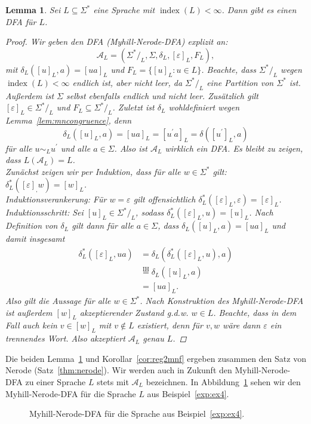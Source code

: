 \documentclass[11pt, a4paper]{article}
\theoremstyle{definition}
\theoremstyle{plain}
\newtheorem{lemma}[definition]{Lemma}
\numberwithin{equation}{section}
\DeclareMathOperator{\ind}{index}
\begin{document}
\begin{lemma}\label{lem:mnf2reg}
	Sei $L \subseteq \Sigma^\ast$ eine Sprache mit $\ind(L) < \infty$. Dann gibt es einen DFA für $L$.
	\begin{proof}
		Wir geben den DFA (\textit{Myhill-Nerode-DFA}) explizit an:
		$$
			\mathcal{A}_L = (\Sigma^\ast/_L, \Sigma, \delta_L, [\varepsilon]_L, F_L),
		$$
		mit $\delta_L([u]_L, a) = [ua]_L$ und $F_L = \{[u]_L : u \in L\}$. Beachte, dass $\Sigma^\ast/_L$ wegen $\ind(L) < \infty$ endlich ist, aber nicht leer, da $\Sigma^\ast/_L$ eine Partition von $\Sigma^\ast$ ist. Außerdem ist $\Sigma$ selbst ebenfalls endlich und nicht leer. Zusätzlich gilt $[\varepsilon]_L \in \Sigma^\ast/_L$ und $F_L \subseteq \Sigma^\ast/_L$. Zuletzt ist $\delta_L$ wohldefiniert wegen Lemma~\ref{lem:mncongruence}, denn 
		$$
			\delta_L([u]_L, a) = [ua]_L = [u^\prime a]_L = \delta([u^\prime]_L, a)
		$$
		für alle $u \sim_L u^\prime$ und alle $a \in \Sigma$. Also ist $\mathcal{A}_L$ wirklich ein DFA. Es bleibt zu zeigen, dass $L(\mathcal{A}_L) = L$.\\
		Zunächst zeigen wir per Induktion, dass für alle $w \in \Sigma^\ast$ gilt: $\delta_L^\ast([\varepsilon]_, w) = [w]_L$.\\
		Induktionsverankerung: Für $w = \varepsilon$ gilt offensichtlich $\delta_L^\ast([\varepsilon]_L, \varepsilon) = [\varepsilon]_L$. \checkmark\\
		Induktionsschritt: Sei $[u]_L \in \Sigma^\ast/_L$, sodass $\delta_L^\ast([\varepsilon]_L, u) = [u]_L$. Nach Definition von $\delta_L$ gilt dann für alle $a \in \Sigma$, dass $\delta_L([u]_L, a) = [ua]_L$ und damit insgesamt
		\begin{align*}
			\delta_L^\ast([\varepsilon]_L, ua) &= \delta_L(\delta_L^\ast([\varepsilon]_L, u), a)\\
			&\overset{\text{IH}}{=} \delta_L([u]_L, a)\\
			&= [ua]_L.
		\end{align*}
		Also gilt die Aussage für alle $w \in \Sigma^\ast$. Nach Konstruktion des Myhill-Nerode-DFA ist außerdem $[w]_L$ akzeptierender Zustand g.d.w. $w \in L$. Beachte, dass in dem Fall auch kein $v \in [w]_L$ mit $v \notin L$ existiert, denn für $v, w$ wäre dann $\varepsilon$ ein trennendes Wort. Also akzeptiert $\mathcal{A}_L$ genau $L$.
	\end{proof}
\end{lemma}
Die beiden Lemma~\ref{lem:mnf2reg} und Korollar~\ref{cor:reg2mnf} ergeben zusammen den Satz von Nerode (Satz~\ref{thm:nerode}). Wir werden auch in Zukunft den Myhill-Nerode-DFA zu einer Sprache $L$ stets mit $\mathcal{A}_L$ bezeichnen. In Abbildung~\ref{fig:mndfa} sehen wir den Myhill-Nerode-DFA für die Sprache $L$ aus Beispiel~\ref{exp:ex4}.
\begin{figure}
	\centering
	
	\caption{Myhill-Nerode-DFA für die Sprache aus Beispiel~\ref{exp:ex4}.}
	\label{fig:mndfa}
\end{figure}
\end{document}
